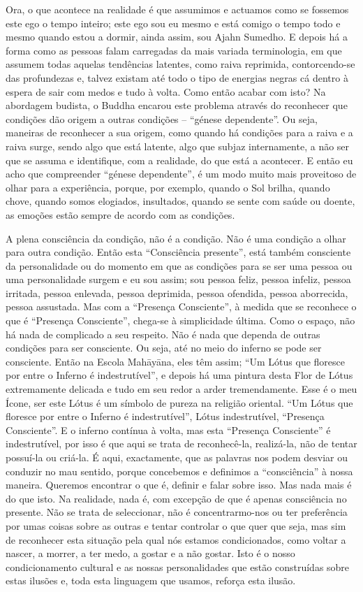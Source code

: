 Ora, o que acontece na realidade é que assumimos e actuamos como se
fossemos este ego o tempo inteiro; este ego sou eu mesmo e está comigo o
tempo todo e mesmo quando estou a dormir, ainda assim, sou Ajahn
Sumedho. E depois há a forma como as pessoas falam carregadas da mais
variada terminologia, em que assumem todas aquelas tendências latentes,
como raiva reprimida, contorcendo-se das profundezas e, talvez existam
até todo o tipo de energias negras cá dentro à espera de sair com medos
e tudo à volta. Como então acabar com isto? Na abordagem budista, o
Buddha encarou este problema através do reconhecer que condições dão
origem a outras condições -- ``génese dependente''. Ou seja, maneiras de
reconhecer a sua origem, como quando há condições para a raiva e a raiva
surge, sendo algo que está latente, algo que subjaz internamente, a não
ser que se assuma e identifique, com a realidade, do que está a
acontecer. E então eu acho que compreender ``génese dependente'', é um
modo muito mais proveitoso de olhar para a experiência, porque, por
exemplo, quando o Sol brilha, quando chove, quando somos elogiados,
insultados, quando se sente com saúde ou doente, as emoções estão sempre
de acordo com as condições.

A plena consciência da condição, não é a condição. Não é uma condição a
olhar para outra condição. Então esta ``Consciência presente'', está
também consciente da personalidade ou do momento em que as condições
para se ser uma pessoa ou uma personalidade surgem e eu sou assim; sou
pessoa feliz, pessoa infeliz, pessoa irritada, pessoa enlevada, pessoa
deprimida, pessoa ofendida, pessoa aborrecida, pessoa assustada. Mas com
a ``Presença Consciente'', à medida que se reconhece o que é ``Presença
Consciente'', chega-se à simplicidade última. Como o espaço, não há nada
de complicado a seu respeito. Não é nada que dependa de outras condições
para ser consciente. Ou seja, até no meio do inferno se pode ser
consciente. Então na Escola Mahāyāna, eles têm assim; ``Um Lótus que
floresce por entre o Inferno é indestrutível'', e depois há uma pintura
desta Flor de Lótus extremamente delicada e tudo em seu redor a arder
tremendamente. Esse é o meu Ícone, ser este Lótus é um símbolo de pureza
na religião oriental. ``Um Lótus que floresce por entre o Inferno é
indestrutível'', Lótus indestrutível, ``Presença Consciente''. E o
inferno contínua à volta, mas esta ``Presença Consciente'' é
indestrutível, por isso é que aqui se trata de reconhecê-la, realizá-la,
não de tentar possuí-la ou criá-la. É aqui, exactamente, que as palavras
nos podem desviar ou conduzir no mau sentido, porque concebemos e
definimos a ``consciência'' à nossa maneira. Queremos encontrar o que é,
definir e falar sobre isso. Mas nada mais é do que isto. Na realidade,
nada é, com excepção de que é apenas consciência no presente. Não se
trata de seleccionar, não é concentrarmo-nos ou ter preferência por umas
coisas sobre as outras e tentar controlar o que quer que seja, mas sim
de reconhecer esta situação pela qual nós estamos condicionados, como
voltar a nascer, a morrer, a ter medo, a gostar e a não gostar. Isto é o
nosso condicionamento cultural e as nossas personalidades que estão
construídas sobre estas ilusões e, toda esta linguagem que usamos,
reforça esta ilusão.


